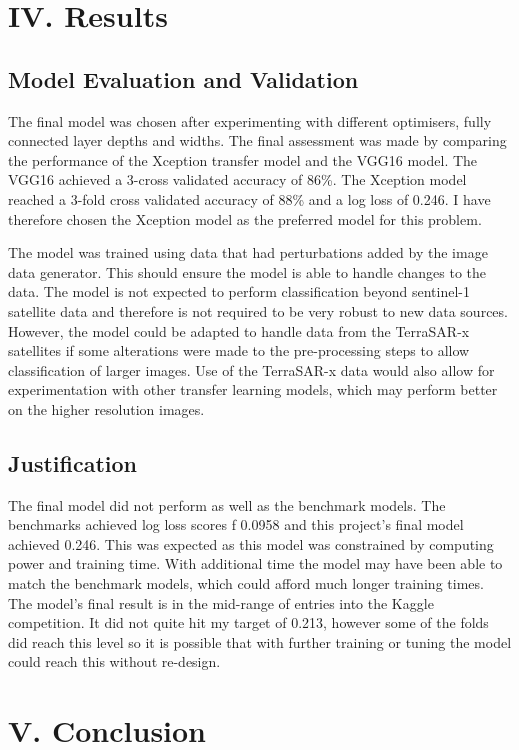 \documentclass{article}
\begin{document}
\section{IV. Results}
\subsection{Model Evaluation and Validation}
The final model was chosen after experimenting with different optimisers, fully connected layer depths and widths. The final assessment was made by comparing the performance of the Xception transfer model and the VGG16 model. The VGG16 achieved a 3-cross validated accuracy of 86\%. The Xception model reached a 3-fold cross validated accuracy of 88\% and a log loss of 0.246. I have therefore chosen the Xception model as the preferred model for this problem.
	
	
The model was trained using data that had perturbations added by the image data generator. This should ensure the model is able to handle changes to the data. The model is not expected to perform classification beyond sentinel-1 satellite data and therefore is not required to be very robust to new data sources. However, the model could be adapted to handle data from the TerraSAR-x satellites if some alterations were made to the pre-processing steps to allow classification of larger images. Use of the TerraSAR-x data would also allow for experimentation with other transfer learning models, which may perform better on the higher resolution images. 

\subsection{Justification}
The final model did not perform as well as the benchmark models. The benchmarks achieved log loss scores f 0.0958 and this project's final model achieved 0.246. This was expected as this model was constrained by computing power and training time. With additional time the model may have been able to match the benchmark models, which could afford much longer training times. The model's final result is in the mid-range of entries into the Kaggle competition. It did not quite hit my target of 0.213, however some of the folds did reach this level so it is possible that with further training or tuning the model could reach this without re-design. 
\section{V. Conclusion}
\end{document}
